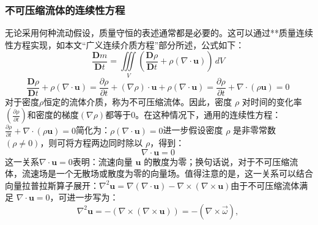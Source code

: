 \subsubsection{不可压缩流体的连续性方程}
无论采用何种流动假设，质量守恒的表述通常都是必要的。这可以通过**质量连续性方程实现，如本文“广义连续介质方程”部分所述，公式如下：
$$
\frac{\mathbf{D} m}{\mathbf{D} t}
= \iiint\limits_V 
\left(
\frac{\mathbf{D} \rho}{\mathbf{D} t}
+ \rho (\nabla \cdot \mathbf{u})
\right)
\, dV~
$$
$$
\frac{\mathbf{D} \rho}{\mathbf{D} t}
+ \rho (\nabla \cdot \mathbf{u})
=
\frac{\partial \rho}{\partial t}
+ (\nabla \rho) \cdot \mathbf{u}
+ \rho (\nabla \cdot \mathbf{u})
=
\frac{\partial \rho}{\partial t}
+ \nabla \cdot (\rho \mathbf{u})
= 0~
$$
对于密度$\rho$恒定的流体介质，称为不可压缩流体。因此，密度 $\rho$ 对时间的变化率$\displaystyle \left(\frac{\partial \rho}{\partial t}\right)$和密度的梯度$\displaystyle (\nabla \rho)$都等于0。在这种情况下，通用的连续性方程：$\frac{\partial \rho}{\partial t} + \nabla \cdot (\rho \mathbf{u}) = 0$简化为：$\rho (\nabla \cdot \mathbf{u}) = 0$进一步假设密度 $\rho$ 是非零常数 $(\rho \neq 0)$，则可将方程两边同时除以 $\rho$，得到：
$$
\nabla \cdot \mathbf{u} = 0~
$$
这一关系$\nabla \cdot \mathbf{u} = 0$表明：流速向量 $\mathbf{u}$ 的散度为零；换句话说，对于不可压缩流体，流速场是一个无散场或散度为零的向量场。值得注意的是，这一关系可以结合向量拉普拉斯算子展开：$\nabla^2 \mathbf{u}= \nabla (\nabla \cdot \mathbf{u})- \nabla \times (\nabla \times \mathbf{u})$由于不可压缩流体满足 $\nabla \cdot \mathbf{u} = 0$，可进一步写为：
$$
\nabla^2 \mathbf{u}
= -(\nabla \times (\nabla \times \mathbf{u}))
= -(\nabla \times \vec{\omega}),~
$$
